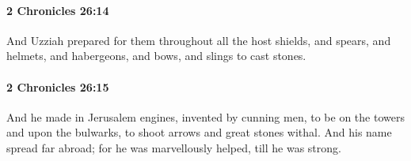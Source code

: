 		\paragraph{2 Chronicles 26:14} %
			\label{2CHRONICLES-26-14}

			And Uzziah prepared for them throughout all the host shields, and spears, and helmets, and habergeons, and bows, and slings to cast stones.


		\paragraph{2 Chronicles 26:15} %
			\label{2CHRONICLES-26-15}

			And he made in Jerusalem engines, invented by cunning men, to be on the towers and upon the bulwarks, to shoot arrows and great stones withal. And his name spread far abroad; for he was marvellously helped, till he was strong.

